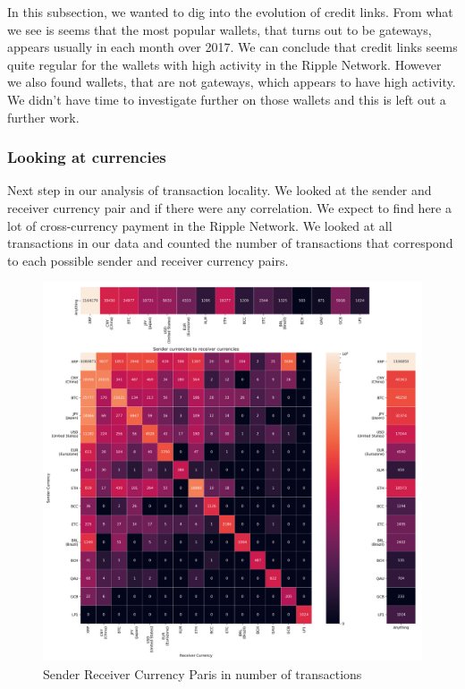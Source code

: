 In this subsection, we wanted to dig into the evolution of credit links. From what we see is seems that the most popular wallets, that turns out to be gateways, appears usually in each month over 2017. We can conclude that credit links seems quite regular for the wallets with high activity in the Ripple Network. However we also found wallets, that are not gateways, which appears to have high activity. We didn't have time to investigate further on those wallets and this is left out a further work.

\subsubsection{Looking at currencies}
Next step in our analysis of transaction locality. We looked at the sender and receiver currency pair and if there were any correlation. We expect to find here a lot of cross-currency payment in the Ripple Network. We looked at all transactions in our data and counted the number of transactions that correspond to each possible sender and receiver currency pairs.
\begin{figure}[h!]
    \centering
    \includegraphics[width = \linewidth]{sender_to_receiver_heatmap.png}
    \caption{Sender Receiver Currency Paris in number of transactions}
    \label{fig:heatmapNbTxns}
\end{figure}
